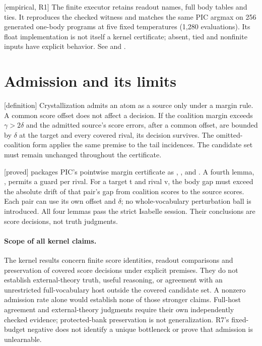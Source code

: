 \documentclass[11pt]{article}
\newcommand{\status}[1]{\textsf{[#1]}}
\begin{document}
\status{empirical, R1} The finite executor retains readout names, full body
tables and ties. It reproduces the checked witness and matches the same PIC
argmax on 256 generated one-body programs at five fixed temperatures
(1,280 evaluations). Its float implementation is not itself a kernel
certificate; absent, tied and nonfinite inputs have explicit behavior.
See  and .

\section{Admission and its limits}

\status{definition} Crystallization admits an atom as a source only under
a margin rule. A common score offset does not affect a decision. If the
coalition margin exceeds $\gamma>2\delta$ and the admitted source's score
errors, after a common offset, are bounded by $\delta$ at the target and
every covered rival, its decision survives. The omitted-coalition form
applies the same premise to the tail incidences. The candidate set must
remain unchanged throughout the certificate.

\status{proved}  packages PIC's
pointwise margin certificate as ,
, and
. A fourth lemma,
, permits a guard per rival.
For a target t and rival v, the body gap must exceed the absolute drift of
that pair's gap from coalition scores to the source scores. Each pair can
use its own offset and $\delta$; no whole-vocabulary perturbation ball is
introduced. All four lemmas pass the strict Isabelle session. Their
conclusions are score decisions, not truth judgments.

\paragraph{Scope of all kernel claims.}
The kernel results concern finite score identities, readout comparisons and
preservation of covered score decisions under explicit premises. They do
not establish external-theory truth, useful reasoning, or agreement with
an unrestricted full-vocabulary host outside the covered candidate set.
A nonzero admission rate alone would establish none of those stronger
claims. Full-host agreement and external-theory judgments require their
own independently checked evidence; protected-bank preservation is not
generalization. R7's fixed-budget negative does not identify a unique
bottleneck or prove that admission is unlearnable.
\end{document}

